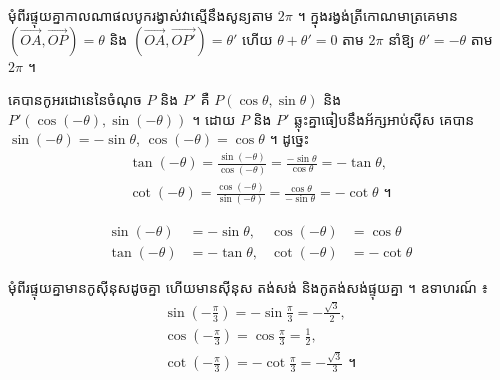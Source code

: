 មុំពីរផ្ទុយគ្នាកាលណាផលបូករង្វាស់វាស្មើនឹងសូន្យតាម $2\pi$ ។ ក្នុងរង្វង់ត្រីកោណមាត្រគេមាន $(\overrightarrow{OA}, \overrightarrow{OP}) = \theta$ និង $(\overrightarrow{OA}, \overrightarrow{OP'}) = \theta'$ ហើយ $\theta + \theta' = 0$ តាម $2\pi$ នាំឱ្យ $\theta' = -\theta$ តាម $2\pi$ ។
\begin{center}
\end{center}
គេបានកូអរដោនេនៃចំណុច $P$ និង $P'$ គឺ $P(\cos\theta, \sin\theta)$ និង $P'(\cos(-\theta), \sin(-\theta))$ ។ ដោយ $P$ និង $P'$ ឆ្លុះគ្នាធៀបនឹងអ័ក្សអាប់ស៊ីស គេបាន $\sin(-\theta) = -\sin\theta$, $\cos(-\theta) = \cos\theta$ ។ ដូច្នេះ
\[
\begin{gathered}
\tan(-\theta) = \frac{\sin(-\theta)}{\cos(-\theta)} = \frac{-\sin\theta}{\cos\theta} = -\tan\theta,\\
\cot(-\theta) = \frac{\cos(-\theta)}{\sin(-\theta)} = \frac{\cos\theta}{-\sin\theta} = -\cot\theta \text{ ។}
\end{gathered}
\]
\begin{formulaBox}[គេបានរូបមន្ត]
\[
\begin{aligned}
\sin(-\theta) &= -\sin\theta, & \cos(-\theta) &= \cos\theta\\
\tan(-\theta) &= -\tan\theta, & \cot(-\theta) &= -\cot\theta
\end{aligned}
\]
\end{formulaBox}
\begin{note}[សម្គាល់]
មុំពីរផ្ទុយគ្នាមានកូស៊ីនុសដូចគ្នា ហើយមានស៊ីនុស តង់សង់ និងកូតង់សង់ផ្ទុយគ្នា ។ ឧទាហរណ៍ ៖
\[
\begin{gathered}
\sin\left(-\frac{\pi}{3}\right) = -\sin\frac{\pi}{3} = -\frac{\sqrt{3}}{2},\\
\cos\left(-\frac{\pi}{3}\right) = \cos\frac{\pi}{3} = \frac{1}{2},\\
\cot\left(-\frac{\pi}{3}\right) = -\cot\frac{\pi}{3} = -\frac{\sqrt{3}}{3} \text{ ។}
\end{gathered}
\]
\end{note}


